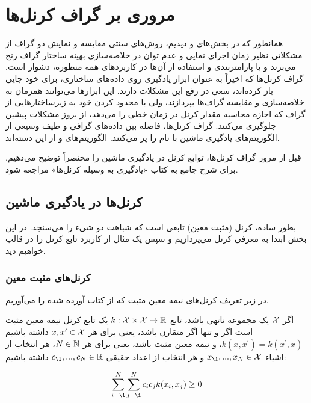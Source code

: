 \section{مروری بر گراف کرنل‌ها}\label{sec:graph-kernels-review}
همانطور که در بخش‌های  و  دیدیم، روش‌های سنتی مقایسه و نمایش دو گراف از مشکلاتی نظیر زمان اجرای نمایی و عدم توان در خلاصه‌سازی بهینه ساختار گراف رنج می‌برند و یا پارامتربندی و استفاده از آن‌ها در کاربردهای همه منظوره، دشوار است. گراف کرنل‌ها که اخیراً به عنوان ابزار یادگیری روی داده‌های ساختاری، برای خود جایی باز کرده‌اند، سعی در رفع این مشکلات دارند. این ابزارها می‌توانند همزمان به خلاصه‌سازی و مقایسه گراف‌ها بپردازند، ولی با محدود کردن خود به زیرساختارهایی از گراف که اجازه محاسبه مقدار کرنل در زمان خطی را می‌دهد، از بروز مشکلات پیشین جلوگیری می‌کنند. گراف کرنل‌ها، فاصله بین داده‌های گرافی و طیف وسیعی از الگوریتم‌های یادگیری ماشین با نام  را پر می‌کنند. الگوریتم‌های  و  از این دسته‌اند.

قبل از مرور گراف کرنل‌ها، توابع کرنل در یادگیری ماشین را مختصراً توضیح می‌دهیم. برای شرح جامع به کتاب «یادگیری به وسیله کرنل‌ها» مراجعه شود.

\subsection{کرنل‌ها در یادگیری ماشین}
بطور ساده، کرنل (مثبت معین) تابعی است که شباهت دو شیء را می‌سنجد. در این بخش ابتدا به معرفی کرنل می‌پردازیم و سپس یک مثال از کاربرد تابع کرنل را در قالب  خواهیم دید.

\subsubsection{کرنل‌های مثبت معین}\label{sec:positive-semidefinite-kernels}
در زیر تعریف کرنل‌های نیمه معین مثبت که از کتاب  آورده شده را می‌آوریم.
\begin{definition}
اگر $\mathcal{X}$ یک مجموعه ناتهی باشد، تابع $k: \mathcal{X} \times \mathcal{X} \mapsto \mathbb{R}$ یک تابع کرنل نیمه معین مثبت است اگر و تنها اگر متقارن باشد، یعنی برای هر $x,x^\prime \in \mathcal{X}$ داشته باشیم
$k(x,x^\prime) = k(x^\prime,x)$، و نیمه معین مثبت باشد، 
یعنی برای هر $N \in \mathbb{N}$، هر انتخاب از اشیاء $x_\1,...,x_N \in \mX$ و هر انتخاب از اعداد حقیقی $c_\1,...,c_N \in \R$ داشته باشیم:

\begin{equation*}
\sum_{i=\1}^{N}\sum_{j=\1}^{N}c_ic_jk(x_i,x_j) \geq 0
\end{equation*}
\end{definition}

